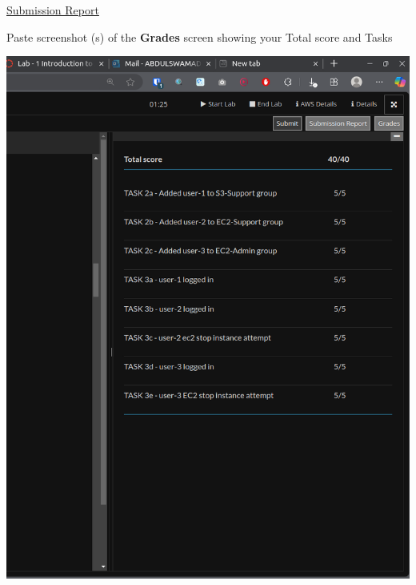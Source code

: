 \documentclass[11pt]{article}
\begin{document}
\newpage

\noindent\underline{Submission Report}

\vspace{0.5cm}

\noindent Paste screenshot (s) of the \textbf{Grades} screen showing your Total score and Tasks \\


\vspace{5mm}



{\centering
\includegraphics[width=5.8in]{pics/grades.png}
}
\end{document}
